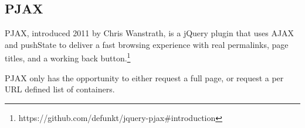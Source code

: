 \subsection{PJAX\label{pjax}}
PJAX, introduced 2011 by Chris Wanstrath, is a jQuery plugin that uses AJAX and pushState to deliver a fast browsing experience with real permalinks, page titles, and a working back button.\footnote{https://github.com/defunkt/jquery-pjax\#introduction}

PJAX only has the opportunity to either request a full page, or request a per URL defined list of containers.
